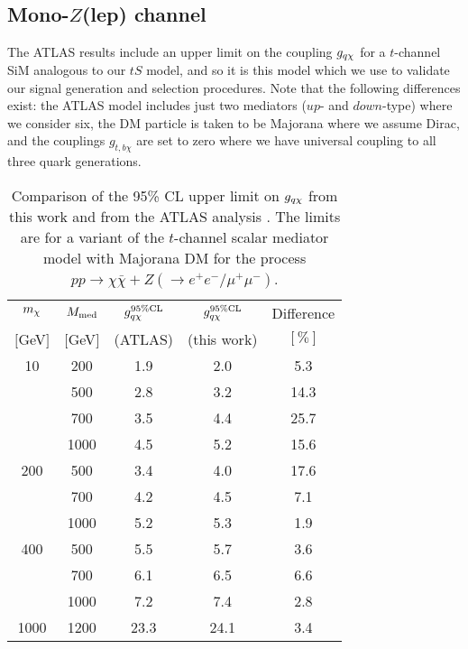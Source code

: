 \subsection{Mono-$Z$(lep) channel}
\label{monoZ_validation}

The ATLAS \monoZ results include an upper limit on the coupling $g_{q \chi}$ for a $t$-channel SiM analogous to our $tS$ model, and so it is this model which we use to validate our signal generation and selection procedures. Note that the following differences exist: the ATLAS model includes just two mediators ($up$- and $down$-type) where we consider six, the DM particle is taken to be Majorana where we assume Dirac, and the couplings $g_{t,b \chi}$ are set to zero where we have universal coupling to all three quark generations.

\begin{table}
\begin{center}
\begin{tabular}{ c | c | c | c | c }
\hline
\hline
$m_{\chi}$ & $M_{\mathrm{med}}$ & $g_{q \chi}^{95\%\mathrm{CL}}$ & $g_{q \chi}^{95\%\mathrm{CL}}$ & Difference \T \\
$[$GeV$]$ & $[$GeV$]$ & (ATLAS) & (this work) & $[\%]$ \B \\
\hline
10 & 200 & 1.9 & 2.0 & 5.3 \T \\
 & 500 & 2.8 & 3.2 & 14.3 \\
 & 700 & 3.5 & 4.4 & 25.7 \\
 & 1000 & 4.5 & 5.2 & 15.6 \\
200 & 500 & 3.4 & 4.0 & 17.6 \T \\
 & 700 & 4.2 & 4.5 & 7.1 \\
 & 1000 & 5.2 & 5.3 & 1.9 \\
400 & 500 & 5.5 & 5.7 & 3.6 \T \\
 & 700 & 6.1 & 6.5 & 6.6 \\
 & 1000 & 7.2 & 7.4 & 2.8 \\
1000 & 1200 & 23.3 & 24.1 & 3.4 \T \B \\
\hline
\hline
\end{tabular}
\end{center}
\caption{Comparison of the 95\% CL upper limit on $g_{q \chi}$ from this work and from the ATLAS \monoZ analysis \cite{Aad:2014monoZlep}. The limits are for a variant of the $t$-channel scalar mediator model with Majorana DM for the process $pp \rightarrow \chi \bar{\chi} + Z (\rightarrow e^{+}e^{-}/\mu^{+}\mu^{-})$.}
\label{tab:monoZvalidation}
\end{table}

